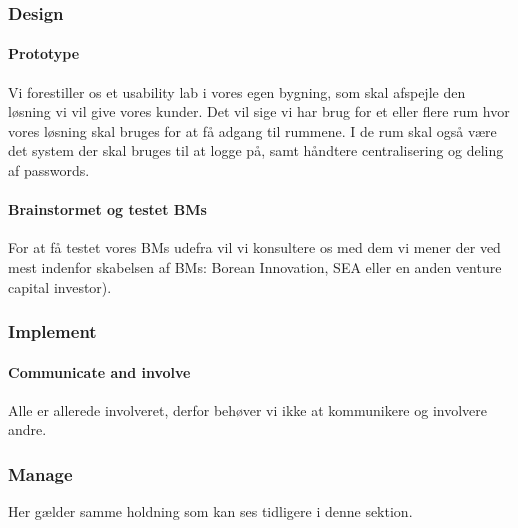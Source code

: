 \subsubsection{Design}
\paragraph{Prototype}
Vi forestiller os et usability lab i vores egen bygning, som skal afspejle den løsning vi vil give vores kunder.
Det vil sige vi har brug for et eller flere rum hvor vores løsning skal bruges for at få adgang til rummene.
I de rum skal også være det system der skal bruges til at logge på, samt håndtere centralisering og deling af passwords.

\paragraph{Brainstormet og testet BMs}
For at få testet vores BMs udefra vil vi konsultere os med dem vi mener der ved mest indenfor skabelsen af BMs: Borean Innovation, SEA eller en anden venture capital investor).

\subsubsection{Implement}
\paragraph{Communicate and involve}
Alle er allerede involveret, derfor behøver vi ikke at kommunikere og involvere andre.

\subsubsection{Manage}
Her gælder samme holdning som kan ses tidligere i denne sektion.
